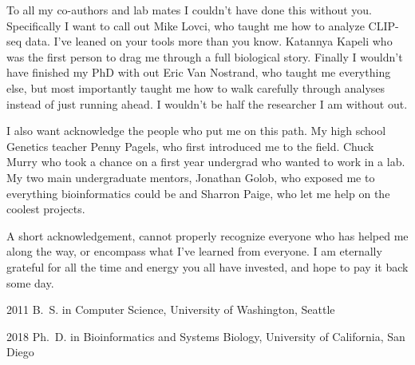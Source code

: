 \begin{frontmatter}
%
\tableofcontents
\listoffigures  %



%
%
\begin{acknowledgements}
To all my co-authors and lab mates I    couldn't have done this without you.    Specifically I want to call out Mike Lovci, who taught me how to analyze CLIP-seq data.  I’ve leaned on your tools more than you know.  Katannya Kapeli who was the first person to drag me through a full biological story.  Finally I wouldn’t have finished my PhD with out Eric Van Nostrand, who taught me everything else, but most importantly taught me how to walk carefully through analyses instead of just running ahead. I wouldn’t be half the researcher I am without out.

I also want acknowledge the people who put me on this path. My high school Genetics teacher Penny Pagels, who first introduced me to the field.  Chuck Murry who took a chance on a first year undergrad who wanted to work in a lab. My two main undergraduate mentors, Jonathan Golob, who exposed me to everything bioinformatics could be and Sharron Paige, who let me help on the coolest projects.

A short acknowledgement, cannot properly recognize everyone who has helped me along the way, or encompass what I’ve learned from everyone.  I am eternally grateful for all the time and energy you all have invested, and hope to pay it back some day.

\end{acknowledgements}


%
%
\begin{vitapage}
\begin{vita}
  \item[2011] B.~S. in Computer Science, University of Washington, Seattle
  \item[2018] Ph.~D. in Bioinformatics and Systems Biology, University of California, San Diego
\end{vita}
\begin{publications}


\end{publications}
\end{vitapage}
\end{frontmatter}

